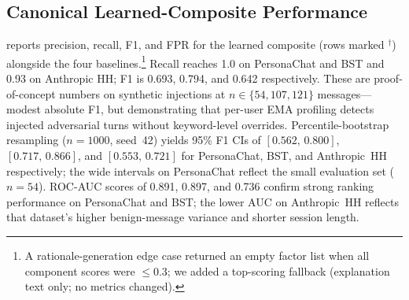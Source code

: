 \documentclass[conference]{IEEEtran}
\begin{document}
\subsection{Canonical Learned-Composite Performance}
\label{sec:results:canonical}

 reports precision, recall, F1, and FPR for the learned composite
(rows marked $^\dagger$) alongside the four baselines.\footnote{A rationale-generation
edge case returned an empty factor list when all component scores were $\le 0.3$; we
added a top-scoring fallback (explanation text only; no metrics changed).}
Recall reaches 1.0 on PersonaChat and BST and 0.93 on Anthropic HH; F1 is
0.693, 0.794, and 0.642 respectively.
These are proof-of-concept numbers on synthetic injections at $n \in \{54, 107, 121\}$
messages---modest absolute F1, but demonstrating that per-user EMA profiling
detects injected adversarial turns without keyword-level overrides.
Percentile-bootstrap resampling ($n{=}1000$, seed~42) yields 95\% F1 CIs of
$[0.562,\,0.800]$, $[0.717,\,0.866]$, and $[0.553,\,0.721]$
for PersonaChat, BST, and Anthropic~HH respectively;
the wide intervals on PersonaChat reflect the small evaluation set ($n{=}54$).
ROC-AUC scores of 0.891, 0.897, and 0.736 confirm strong ranking performance
on PersonaChat and BST; the lower AUC on Anthropic~HH reflects that dataset's
higher benign-message variance and shorter session length.
\end{document}
